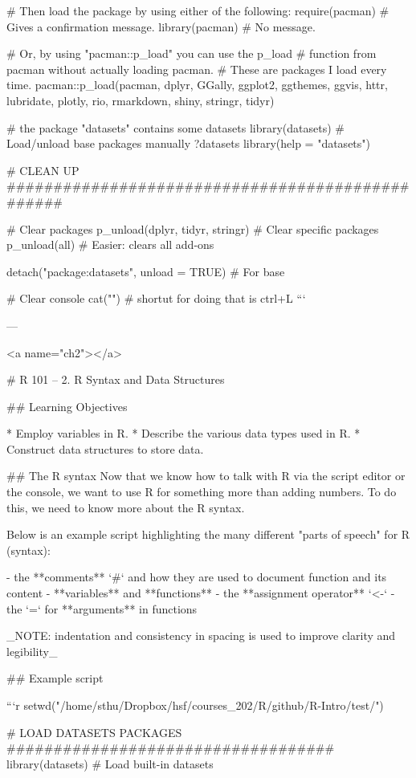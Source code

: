 # Then load the package by using either of the following:
require(pacman)  # Gives a confirmation message.
library(pacman)  # No message.

# Or, by using "pacman::p_load" you can use the p_load
# function from pacman without actually loading pacman.
# These are packages I load every time.
pacman::p_load(pacman, dplyr, GGally, ggplot2, ggthemes, 
               ggvis, httr, lubridate, plotly, rio, rmarkdown, shiny, 
               stringr, tidyr) 


# the package "datasets" contains some datasets 
library(datasets)  # Load/unload base packages manually
?datasets
library(help = "datasets")

# CLEAN UP #################################################

# Clear packages
p_unload(dplyr, tidyr, stringr) # Clear specific packages
p_unload(all)  # Easier: clears all add-ons

detach("package:datasets", unload = TRUE)  # For base

# Clear console
cat("")  # shortut for doing that is ctrl+L
```

---

<a name="ch2"></a>

# R 101 -- 2. R Syntax and Data Structures


## Learning Objectives

* Employ variables in R.
* Describe the various data types used in R. 
* Construct data structures to store data.

## The R syntax
Now that we know how to talk with R via the script editor or the console, we want to use R for something more than adding numbers. To do this, we need to know more about the R syntax. 


Below is an example script highlighting the many different "parts of speech" for R (syntax):

  - the **comments** `#` and how they are used to document function and its content
  - **variables** and **functions**
  - the **assignment operator** `<-`
  - the `=` for **arguments** in functions

_NOTE: indentation and consistency in spacing is used to improve clarity and legibility_


## Example script

```r 
setwd("/home/sthu/Dropbox/hsf/courses_202/R/github/R-Intro/test/")

# LOAD DATASETS PACKAGES ###################################
library(datasets)  # Load built-in datasets

